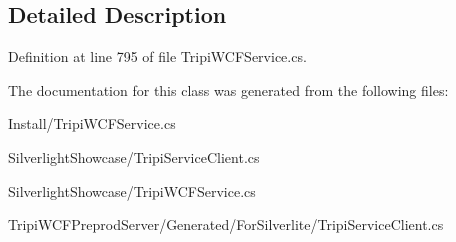 \subsection{Detailed Description}


Definition at line 795 of file TripiWCFService.cs.

The documentation for this class was generated from the following files:\begin{DoxyCompactItemize}
\item 
Install/TripiWCFService.cs\item 
SilverlightShowcase/TripiServiceClient.cs\item 
SilverlightShowcase/TripiWCFService.cs\item 
TripiWCFPreprodServer/Generated/ForSilverlite/TripiServiceClient.cs\end{DoxyCompactItemize}
